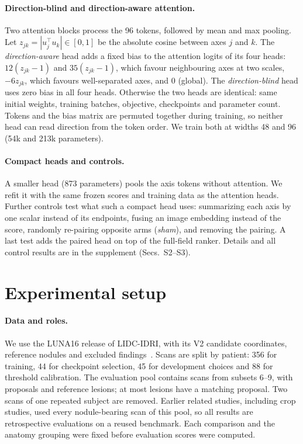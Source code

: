\paragraph{Direction-blind and direction-aware attention.} Two attention blocks process the 96 tokens, followed by mean and max pooling. Let $z_{jk}=|u_j^\top u_k|\in[0,1]$ be the absolute cosine between axes $j$ and $k$. The \emph{direction-aware} head adds a fixed bias to the attention logits of its four heads: $12(z_{jk}-1)$ and $35(z_{jk}-1)$, which favour neighbouring axes at two scales, $-6z_{jk}$, which favours well-separated axes, and $0$ (global). The \emph{direction-blind} head uses zero bias in all four heads. Otherwise the two heads are identical: same initial weights, training batches, objective, checkpoints and parameter count. Tokens and the bias matrix are permuted together during training, so neither head can read direction from the token order. We train both at widths 48 and 96 (54k and 213k parameters).

\paragraph{Compact heads and controls.} A smaller head (873 parameters) pools the axis tokens without attention. We refit it with the same frozen scores and training data as the attention heads. Further controls test what such a compact head uses: summarizing each axis by one scalar instead of its endpoints, fusing an image embedding instead of the score, randomly re-pairing opposite arms (\emph{sham}), and removing the pairing. A last test adds the paired head on top of the full-field ranker. Details and all control results are in the supplement (Secs.~S2--S3).

\section{Experimental setup}
\label{sec:evaluation}

\paragraph{Data and roles.} We use the LUNA16 release of LIDC-IDRI, with its V2 candidate coordinates, reference nodules and excluded findings~\cite{setio2017luna16,armato2011lidc}. Scans are split by patient: 356 for training, 44 for checkpoint selection, 45 for development choices and 88 for threshold calibration. The evaluation pool contains \EvalScans{} scans from subsets 6--9, with \EvalMarks{} proposals and \EvalLesions{} reference lesions; at most \ProposedLesions{} lesions have a matching proposal. Two scans of one repeated subject are removed. Earlier related studies, including crop studies, used every nodule-bearing scan of this pool, so all results are retrospective evaluations on a reused benchmark. Each comparison and the anatomy grouping were fixed before evaluation scores were computed.

